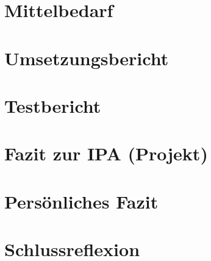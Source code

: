 \section{Mittelbedarf}

\section{Umsetzungsbericht}

\section{Testbericht}

\section{Fazit zur IPA (Projekt)}

\section{Persönliches Fazit}

\section{Schlussreflexion}
